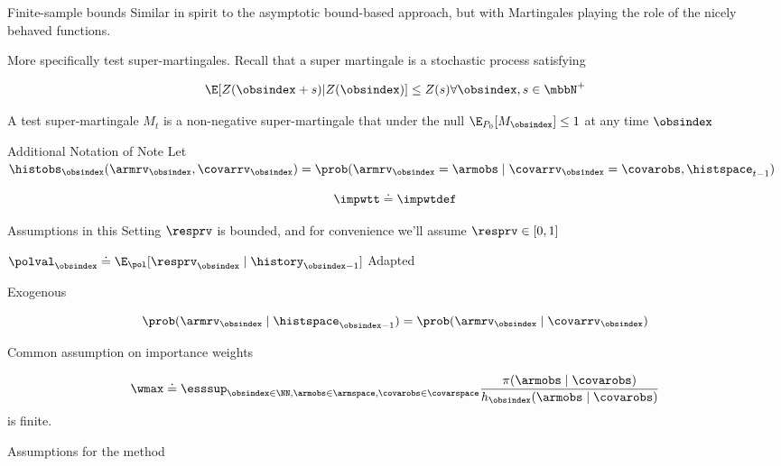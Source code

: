 \documentclass[aspectratio=169, professionalfonts]{beamer}
\begin{document}
\begin{frame}{Finite-sample bounds}
	Similar in spirit to the asymptotic bound-based approach, but with Martingales
	playing the role of the nicely behaved functions.

	More specifically test super-martingales. Recall that a super martingale is
	a stochastic process satisfying

	$$\E[Z(\obsindex + s) | Z(\obsindex)] \leq Z(s) \forall \obsindex, s \in \mbbN^+$$

	A test super-martingale $M_t$ is a non-negative super-martingale that under
	the null $\E_{P_0}[M_\obsindex] \leq 1$ at any time $\obsindex$
\end{frame}

\begin{frame}{Additional Notation of Note}
	Let $\histobs_{\obsindex}(\armrv_{\obsindex}, \covarrv_{\obsindex}) =
		\prob(\armrv_{\obsindex} = \armobs \mid \covarrv_{\obsindex} = \covarobs, \histspace_{t-1})$

	\[\impwtt \doteq \impwtdef \]
\end{frame}

\begin{frame}{Assumptions in this Setting}
	$\resprv$ is bounded, and for convenience we'll assume $\resprv \in [0,1]$

	$\polval_{\obsindex} \doteq \E_{\pol} [\resprv_{\obsindex} \mid \history_{\obsindex-1}]$
	Adapted

	Exogenous

	$$\prob(\armrv_{\obsindex} \mid \histspace_{\obsindex - 1}) =
		\prob(\armrv_{\obsindex} \mid \covarrv_{\obsindex})$$

	Common assumption on importance weights

	\[\wmax \doteq \esssup_{\obsindex \in \NN, \armobs \in \armspace, \covarobs \in
			\covarspace} \frac{\pi(\armobs \mid \covarobs)}{h_{\obsindex}(\armobs \mid
			\covarobs)} \] is finite.
\end{frame}

\begin{frame}{Assumptions for the method}
\end{frame}
\end{document}
